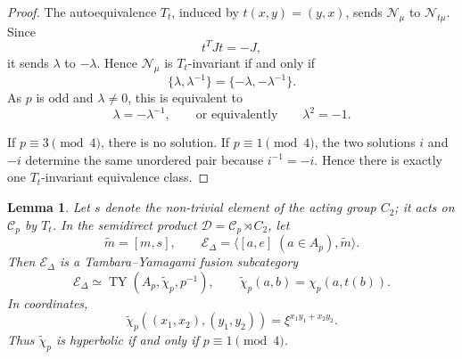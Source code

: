 \documentclass[12pt]{amsart}
\theoremstyle{plain}
\newtheorem{lemma}[theorem]{Lemma}
\theoremstyle{definition} %
\theoremstyle{remark} %
\newcommand{\cC}{\mathcal{C}}
\newcommand{\cD}{\mathcal{D}}
\newcommand{\cE}{\mathcal{E}}
\newcommand{\cN}{\mathcal{N}}
\newcommand{\TY}{\operatorname{TY}}
\begin{document}
\begin{proof}
The autoequivalence \(T_t\), induced by \(t(x,y)=(y,x)\), sends
\(\cN_\mu\) to \(\cN_{t\mu}\). Since
\[
t^TJt=-J,
\]
it sends \(\lambda\) to \(-\lambda\). Hence \(\cN_\mu\) is
\(T_t\)-invariant if and only if
\[
\{\lambda,\lambda^{-1}\}
=
\{-\lambda,-\lambda^{-1}\}.
\]
As \(p\) is odd and \(\lambda\ne0\), this is equivalent to
\[
\lambda=-\lambda^{-1},
\qquad\text{or equivalently}\qquad
\lambda^2=-1.
\]

If \(p\equiv3\pmod4\), there is no solution. If
\(p\equiv1\pmod4\), the two solutions \(i\) and \(-i\) determine the
same unordered pair because \(i^{-1}=-i\). Hence there is exactly one
\(T_t\)-invariant equivalence class.
\end{proof}

\begin{lemma}\label{lem:diagonal_ty_subcategory}
Let $s$ denote the non-trivial element of the acting group $C_2$; it acts on
$\cC_p$ by $T_t$. In the semidirect product $\cD=\cC_p\rtimes C_2$, let
\[
\widetilde m=[m,s],
\qquad
\cE_\Delta=\langle [a,e]\;(a\in A_p),\widetilde m\rangle.
\]
Then $\cE_\Delta$ is a Tambara--Yamagami fusion subcategory
\[
\cE_\Delta\simeq \TY(A_p,\widetilde\chi_p,p^{-1}),
\qquad
\widetilde\chi_p(a,b)=\chi_p(a,t(b)).
\]
In coordinates,
\[
\widetilde\chi_p((x_1,x_2),(y_1,y_2))
=
\xi^{x_1y_1+x_2y_2}.
\]
Thus $\widetilde\chi_p$ is hyperbolic if and only if $p\equiv1\pmod4$.
\end{lemma}
\end{document}
